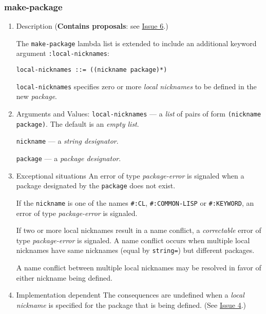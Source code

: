\documentclass[11pt]{article}
\begin{document}
\subsubsection{make-package}
\label{sec:org11654fe}
\begin{enumerate}
\item Description
\label{sec:orge529f42}
(\textbf{Contains proposals}: see \hyperref[sec:org09ee005]{Issue 6}.)

The \texttt{make-package} lambda list is extended to include an additional keyword
argument \texttt{:local-nicknames}:
\begin{verbatim}
local-nicknames ::= ((nickname package)*)
\end{verbatim}


\texttt{local-nicknames} specifies zero or more \emph{local nicknames} to be defined in the
new \emph{package}.
\item Arguments and Values:
\label{sec:org9bc8ff7}
\texttt{local-nicknames} --- a \emph{list} of pairs of form \texttt{(nickname package)}.
The default is an \emph{empty list}.

\texttt{nickname} --- a \emph{string designator}.

\texttt{package} --- a \emph{package designator}.
\item Exceptional situations
\label{sec:org31b71c6}
An error of type \emph{package-error} is signaled when a package designated by the
\texttt{package} does not exist.

If the \texttt{nickname} is one of the names \texttt{\#:CL}, \texttt{\#:COMMON-LISP} or \texttt{\#:KEYWORD}, an
error of type \emph{package-error} is signaled.

If two or more local nicknames result in a name conflict, a \emph{correctable} error
of type \emph{package-error} is signaled. A name conflict occurs when multiple local
nicknames have same nicknames (equal by \texttt{string=}) but different packages.

A name conflict between multiple local nicknames may be resolved in favor of
either nickname being defined.
\item Implementation dependent
\label{sec:orgc594fde}
The consequences are undefined when a \emph{local nickname} is specified for the
package that is being defined. (See \hyperref[sec:org43f3224]{Issue 4}.)
\end{enumerate}
\end{document}
